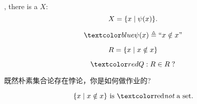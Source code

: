 \begin{frame}{}
  \begin{theorem}[概括原则]
    , there is a  $X$:
    \[
      X = \{x \mid \psi(x)\}.
    \]
  \end{theorem}

  \pause
  \begin{definition}
    \[
      \blue{\psi(x) \triangleq ``x \notin x"}
    \]

    \pause
    \[
      R = \{x \mid x \notin x\}
    \]

    \pause
    \[
      \red{Q: R \in R\;?}
    \]
  \end{definition}
\end{frame}

\begin{frame}{}
  \begin{center}
     既然朴素集合论存在悖论，你是如何做作业的?
    \vspace{0.60cm}
  \end{center}
\end{frame}

\begin{frame}{}
  \begin{center}

    \pause
    \vspace{0.20cm}
    \begin{theorem}
      \[
	\set{x \mid x \notin x} \text{ is \red{\it not} a set.}
      \]
    \end{theorem}
  \end{center}
\end{frame}

